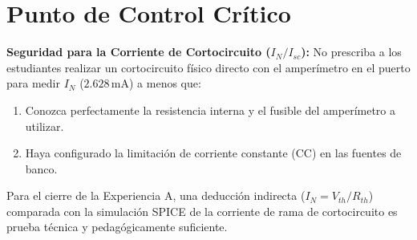 \documentclass[11pt, a4paper]{article}
\begin{document}
\section*{Punto de Control Crítico}
\textbf{Seguridad para la Corriente de Cortocircuito ($I_N / I_{sc}$):} No prescriba a los estudiantes realizar un cortocircuito físico directo con el amperímetro en el puerto para medir $I_N$ ($2.628\,\text{mA}$) a menos que:
\begin{enumerate}
    \item Conozca perfectamente la resistencia interna y el fusible del amperímetro a utilizar.
    \item Haya configurado la limitación de corriente constante (CC) en las fuentes de banco.
\end{enumerate}
Para el cierre de la Experiencia A, una deducción indirecta ($I_N = V_{th}/R_{th}$) comparada con la simulación SPICE de la corriente de rama de cortocircuito es prueba técnica y pedagógicamente suficiente.
\end{document}
